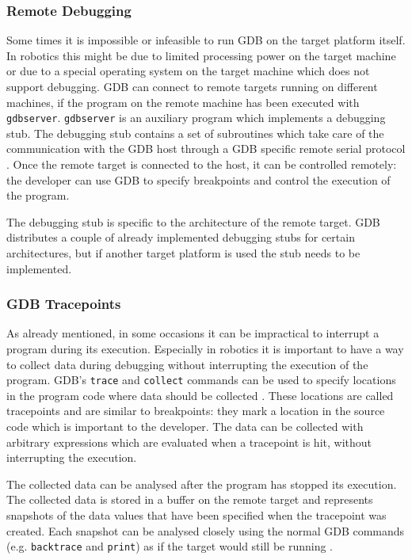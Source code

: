 \subsubsection{Remote Debugging}
Some times it is impossible or infeasible to run GDB on the target platform itself. In robotics this might be due to limited processing power on the target machine or due to a special operating system on the target machine which does not support debugging. GDB can connect to remote targets running on different machines, if the program on the remote machine has been executed with \verb+gdbserver+. \verb+gdbserver+ is an auxiliary program which implements a debugging stub. The debugging stub contains a set of subroutines which take care of the communication with the GDB host through a GDB specific remote serial protocol \cite{Stallman2002}. Once the remote target is connected to the host, it can be controlled remotely: the developer can use GDB to specify breakpoints and control the execution of the program.

The debugging stub is specific to the architecture of the remote target. GDB distributes a couple of already implemented debugging stubs for certain architectures, but if another target platform is used the stub needs to be implemented.

\subsubsection{GDB Tracepoints}
As already mentioned, in some occasions it can be impractical to interrupt a program during its execution. Especially in robotics it is important to have a way to collect data during debugging without interrupting the execution of the program. GDB's \verb+trace+ and \verb+collect+ commands can be used to specify locations in the program code where data should be collected \cite{Stallman2002}. These locations are called tracepoints and are similar to breakpoints: they mark a location in the source code which is important to the developer. The data can be collected with arbitrary expressions which are evaluated when a tracepoint is hit, without interrupting the execution.

The collected data can be analysed after the program has stopped its execution. The collected data is stored in a buffer on the remote target and represents snapshots of the data values that have been specified when the tracepoint was created. Each snapshot can be analysed closely using the normal GDB commands (e.g. \verb+backtrace+ and \verb+print+) as if the target would still be running \cite{Stallman2002}.

